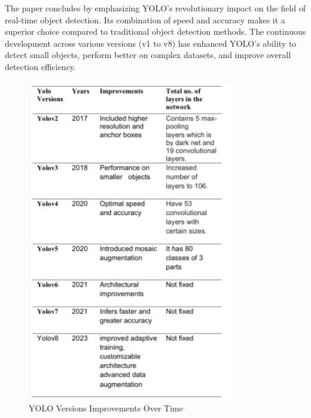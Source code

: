%
The paper concludes by emphasizing YOLO's revolutionary impact on the field of real-time object detection. Its combination of speed and accuracy makes it a superior choice compared to traditional object detection methods. The continuous development across various versions (v1 to v8) has enhanced YOLO's ability to detect small objects, perform better on complex datasets, and improve overall detection efficiency.\\
%
\begin{figure}[h!]
    \centering
    \includegraphics[width=0.8\textwidth]{images/YOLOv1 to YOLOv8.png}
    \caption{YOLO Versions Improvements Over Time}
\end{figure}\\\\
%
%
